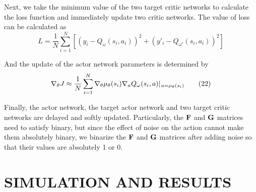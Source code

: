 \documentclass[conference]{IEEEtran}
\begin{document}
     Next, we take the minimum value of the two target critic networks to 
     calculate the loss function and immediately update two critic networks.
     The value of loss can be calculated as 
       \begin{equation}
       L = \frac{1}{N}\sum\limits_{i = 1}^N {\left[ {{{({y_i} - {Q_\omega }({s_i},{a_i}))}^2} + {{(y'_i - {Q_{\omega '}}({s_i},{a_i}))}^2}} \right]}
       \tag{21}\label{eq21}
       \end{equation}

     And the update of the actor network parameters is determined by
       \begin{equation}
       {\nabla _\theta }J \approx \frac{1}{N}\sum\limits_{i = 1}^N {{\nabla _\theta }{\mu _\theta }({s_i}){\nabla _a}{Q_\omega }({s_i},a){|_{{\kern 1pt} a = {\mu _\theta }({s_i})}}} 
       \tag{22}\label{eq22}
       \end{equation}


     Finally, the actor network, the target actor network and two target critic networks 
     are delayed and softly updated. Particularly, the ${\bf{F}}$ and ${\bf{G}}$ matrices need to 
     satisfy binary, but since the effect of noise on the action 
     cannot make them absolutely binary, we binarize the ${\bf{F}}$ and ${\bf{G}}$ 
     matrices after adding noise so that their values are absolutely 
     1 or 0.
\section{SIMULATION AND RESULTS}
\end{document}
